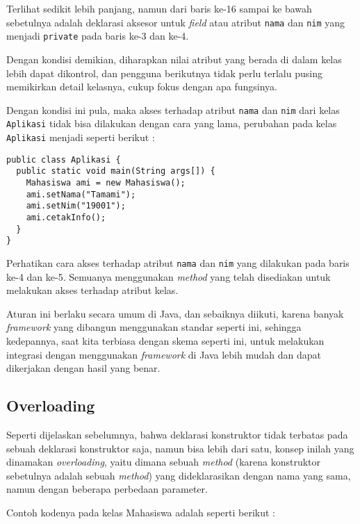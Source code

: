 Terlihat sedikit lebih panjang, namun dari baris ke-16 sampai ke bawah sebetulnya adalah deklarasi aksesor untuk \textit{field} atau atribut \texttt{nama} dan \texttt{nim} yang menjadi \texttt{private} pada baris ke-3 dan ke-4.

Dengan kondisi demikian, diharapkan nilai atribut yang berada di dalam kelas lebih dapat dikontrol, dan pengguna berikutnya tidak perlu terlalu pusing memikirkan detail kelasnya, cukup fokus dengan apa fungsinya.

Dengan kondisi ini pula, maka akses terhadap atribut \texttt{nama} dan \texttt{nim} dari kelas \texttt{Aplikasi} tidak bisa dilakukan dengan cara yang lama, perubahan pada kelas \texttt{Aplikasi} menjadi seperti berikut :

\begin{lstlisting}
public class Aplikasi {
  public static void main(String args[]) {
    Mahasiswa ami = new Mahasiswa();
    ami.setNama("Tamami");
    ami.setNim("19001");
    ami.cetakInfo();
  }
}
\end{lstlisting}

Perhatikan cara akses terhadap atribut \texttt{nama} dan \texttt{nim} yang dilakukan pada baris ke-4 dan ke-5. Semuanya menggunakan \textit{method} yang telah disediakan untuk melakukan akses terhadap atribut kelas.

Aturan ini berlaku secara umum di Java, dan sebaiknya diikuti, karena banyak \textit{framework} yang dibangun menggunakan standar seperti ini, sehingga kedepannya, saat kita terbiasa dengan skema seperti ini, untuk melakukan integrasi dengan menggunakan \textit{framework} di Java lebih mudah dan dapat dikerjakan dengan hasil yang benar.

\subsection{Overloading}

Seperti dijelaskan sebelumnya, bahwa deklarasi konstruktor tidak terbatas pada sebuah deklarasi konstruktor saja, namun bisa lebih dari satu, konsep inilah yang dinamakan \textit{overloading}, yaitu dimana sebuah \textit{method} (karena konstruktor sebetulnya adalah sebuah \textit{method}) yang dideklarasikan dengan nama yang sama, namun dengan beberapa perbedaan parameter.

Contoh kodenya pada kelas Mahasiswa adalah seperti berikut :

